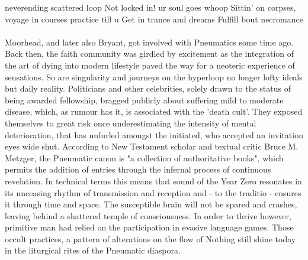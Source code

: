 \documentclass{article}
\begin{document}
neverending scattered loop 
Not locked in! ur soul goes whoop 
Sittin' on corpses, voyage in courses 
practice till u Get in trance 
and dreams Fulfill bout necromance \\

\paragraph{}
Moorhead, and later also Bryant, got involved  
with Pneumatics some time ago.
Back then, the faith community was girdled by excitement 
as the integration of the art of dying into modern lifestyle
paved the way for a neoteric experience of sensations.
So are singularity and journeys on the hyperloop
no longer lofty ideals but daily reality.
Politicians and other celebrities, 
solely drawn to the status of being awarded fellowship, 
bragged publicly about suffering mild to moderate disease, 
which, as rumour has it, is associated with the 'death cult'. 
They exposed themselves to great risk once
underestimating the intensity of mental deterioration, 
that has unfurled amongst the initiated, 
who accepted an invitation eyes wide shut.
According to New Testament scholar and textual critic Bruce M. Metzger, the Pneumatic canon is "a collection of authoritative books", 
which permits the addition of entries 
through the infernal process of continuous revelation.
In technical terms this means that
sound of the Year Zero resonates 
in its unceasing rhythm of transmission and reception 
and - to the traditio - ensures it through time and space.
The susceptible brain will not be spared
and crashes, leaving
behind a shattered temple of consciousness.
In order to thrive however,
primitive man had relied on the participation 
in evasive language games.
Those occult practices, 
a pattern of alterations on the flow of Nothing
still shine today in the liturgical rites 
of the Pneumatic diaspora.
\end{document}
